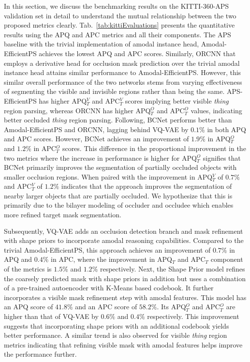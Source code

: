 \documentclass[10pt,twocolumn,letterpaper]{article}
\newcommand{\tabref}[1]{Tab.~\ref{#1}}
\begin{document}
In this section, we discuss the benchmarking results on the KITTI-360-APS validation set in detail to understand the mutual relationship between the two proposed metrics clearly. \tabref{tab:kittiEvaluations} presents the quantitative results using the APQ and APC metrics and all their components. The APS baseline with the trivial implementation of amodal instance head, Amodal-EfficientPS achieves the lowest APQ and APC scores. Similarly, ORCNN that employs a derivative head for occlusion mask prediction over the trivial amodal instance head attains similar performance to Amodal-EfficientPS. However, this similar overall performance of the two networks stems from varying effectiveness of segmenting the visible and invisible regions rather than being the same. APS-EfficientPS has higher APQ$^V_T$ and APC$^V_T$  scores implying better visible \textit{thing} region parsing, whereas ORCNN has higher APQ$^O_T$ and APC$^O_T$  values, indicating better occluded \textit{thing} region parsing. Following, BCNet performs better than Amodal-EfficientPS and ORCNN, lagging behind VQ-VAE by $0.1\%$ in both APQ and APC scores. However, BCNet achieves an improvement of $1.9\%$ in APQ$^O_T$ and $1.2\%$ in APC$^O_T$ scores. This difference in the proportional improvement in the two metrics where the increase in performance is higher for APQ$^O_T$ signifies that BCNet primarily improves the segmentation of partially occluded objects with smaller occlusion regions. When paired with the improvement in APQ$^V_T$ of $0.7\%$ and APC$^V_T$ of $1.2\%$ indicates that the approach improves the segmentation of nearby larger objects that are partially occluded. We hypothesize that this is primarily due to the bilayer modeling of occluder and occludee which enables more refined target mask segmentation.

Subsequently, VQ-VAE adds an occlusion detection branch and mask refinement with shape priors to incorporate amodal reasoning capabilities. Compared to the trivial Amodal-EfficientPS, this approach achieves an improvement of $0.7\%$ in APQ and $0.4\%$ in APC, where the improvement in APQ$_T$ and APC$_T$ component of the metrics is $1.5\%$ and $1.2\%$ respectively. Next, the Shape Prior model refines the coarsely predicted mask with shape priors in addition but uses a combination of a pre-trained autoencoder with K-Means based codebook. It further incorporates a visible mask refinement step with amodal features. This model has an APQ score of $41.8\%$ and an APC score of $58.2\%$. Its APQ$^O_T$ and APC$^O_T$ are higher than that of VQ-VAE by $0.6\%$ and $0.4\%$ respectively. This improvement suggests that incorporating shape priors with an additional codebook yields better performance. A similar trend is also observed for visible \textit{thing} region metrics indicating that refining visible mask with amodal features helps improve the performance further.
\end{document}
